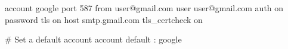 account google
port 587
from user@gmail.com
user user@gmail.com
auth on
password
tls on
host smtp.gmail.com
tls_certcheck on

# Set a default account
account default : google

